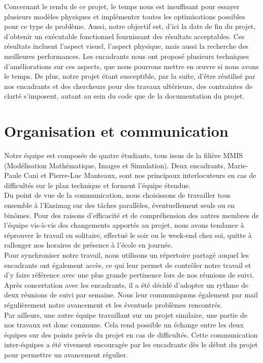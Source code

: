 \documentclass[a4paper,11pt]{article}
\begin{document}
Concernant le rendu de ce projet, le temps nous est insuffisant pour essayer plusieurs modèles physiques et implémenter toutes les optimisations possibles pour ce type de problème. Aussi, notre objectif est, d'ici la date de fin du projet, d'obtenir un exécutable fonctionnel fournissant des résultats acceptables. Ces résultats incluent l'aspect visuel, l'aspect physique, mais aussi la recherche des meilleures performances. Les encadrants nous ont proposé plusieurs techniques d'améliorations sur ces aspects, que nous pourrons mettre en \oe{}uvre si nous avons le temps. De plus, notre projet étant susceptible, par la suite, d'être réutilisé par nos encadrants et des chercheurs pour des travaux ultérieurs, des contraintes de clarté s'imposent, autant au sein du code que de la documentation du projet. 

\section{Organisation et communication}

Notre équipe est composée de quatre étudiants, tous issus de la filière MMIS (Modélisation Mathématique, Images et Simulation). Deux encadrants, Marie-Paule Cani et Pierre-Luc Manteaux, sont nos principaux interlocuteurs en cas de difficultés sur le plan technique et forment l'équipe étendue. \\

Du point de vue de la communication, nous choisissons de travailler tous ensemble à l'Ensimag sur des tâches parallèles, éventuellement seuls ou en binômes. Pour des raisons d'efficacité et de compréhension des autres membres de l'équipe vis-à-vis des changements apportés au projet, nous avons tendance à réprouver le travail en solitaire, effectué le soir ou le week-end chez soi, quitte à rallonger nos horaires de présence à l'école en journée. \\
Pour synchroniser notre travail, nous utilisons un répertoire partagé auquel les encadrants ont également accès, ce qui leur permet de contrôler notre travail et d'y faire référence avec une plus grande pertinence lors de nos réunions de suivi. Après concertation avec les encadrants, il a été décidé d'adopter un rythme de deux réunions de suivi par semaine. Nous leur communiquons également par mail régulièrement notre avancement et les éventuels problèmes rencontrés. \\

Par ailleurs, une autre équipe travaillant sur un projet similaire, une partie de nos travaux est donc commune. Cela rend possible un échange entre les deux équipes sur des points précis du projet en cas de difficultés. Cette communication inter-équipes a été vivement encouragée par les encadrants dès le début du projet pour permettre un avancement régulier.
\end{document}
